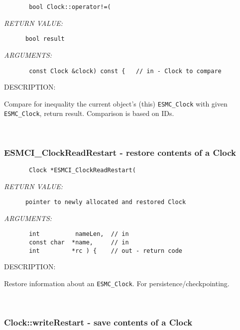    
\begin{verbatim}       bool Clock::operator!=(
     \end{verbatim}{\em RETURN VALUE:}
\begin{verbatim}      bool result\end{verbatim}{\em ARGUMENTS:}
\begin{verbatim}       const Clock &clock) const {   // in - Clock to compare\end{verbatim}
{\sf DESCRIPTION:\\ }


        Compare for inequality the current object's (this)
        {\tt ESMC\_Clock} with given {\tt ESMC\_Clock}, return result.
        Comparison is based on IDs.
      
 
\mbox{}\hrulefill\ 
 
\subsubsection [ESMCI\_ClockReadRestart] {ESMCI\_ClockReadRestart - restore contents of a Clock}


  
\begin{verbatim}       Clock *ESMCI_ClockReadRestart(\end{verbatim}{\em RETURN VALUE:}
\begin{verbatim}      pointer to newly allocated and restored Clock\end{verbatim}{\em ARGUMENTS:}
\begin{verbatim}       int          nameLen,  // in
       const char  *name,     // in
       int         *rc ) {    // out - return code
 \end{verbatim}
{\sf DESCRIPTION:\\ }


        Restore information about an {\tt ESMC\_Clock}.
        For persistence/checkpointing.
    
 
\mbox{}\hrulefill\ 
 
\subsubsection [Clock::writeRestart] {Clock::writeRestart - save contents of a Clock}



